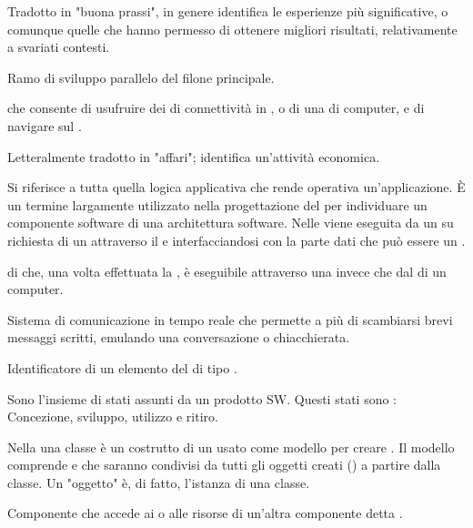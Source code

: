 { 
{Tradotto in "buona prassi", in genere identifica le esperienze più significative, o comunque quelle che hanno permesso di ottenere migliori risultati, relativamente a svariati contesti.}

{Ramo di sviluppo parallelo del filone principale.}

{ che consente di usufruire dei  di connettività in , o di una  di computer, e di navigare sul .}

{Letteralmente tradotto in "affari"; identifica un'attività economica.}

{Si riferisce a tutta quella logica applicativa che rende operativa un'applicazione. \`{E} un termine largamente utilizzato nella progettazione del  per individuare un componente software di una architettura software. Nelle  viene eseguita da un  su richiesta di un  attraverso il  e interfacciandosi con la parte dati che può essere un .}

{ di  che, una volta effettuata la , è eseguibile attraverso una  invece che dal  di un computer.}




{Sistema di comunicazione in tempo reale che permette a più  di scambiarsi brevi messaggi scritti, emulando una conversazione o chiacchierata.}

{Identificatore di un elemento del  di tipo .}

{Sono l'insieme di stati assunti da un prodotto SW.
 Questi stati sono : Concezione, sviluppo, utilizzo e ritiro.}

{Nella   una classe è un costrutto di un  usato come modello per creare . Il modello comprende  e  che saranno condivisi da tutti gli oggetti creati () a partire dalla classe. Un "oggetto" è, di fatto, l'istanza di una classe.}

{Componente che accede ai  o alle risorse di un'altra componente detta .} 

}
